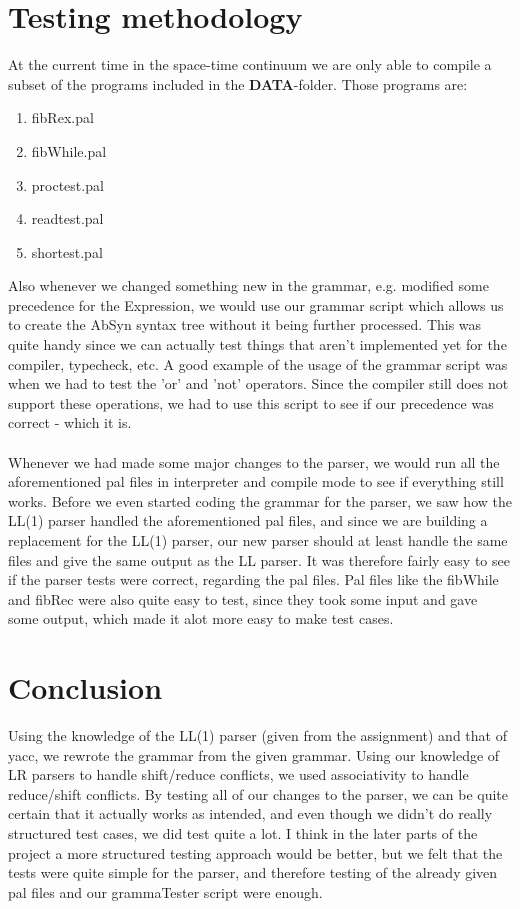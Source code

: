 \documentclass[12pt,a4paper]{article}
\begin{document}
\section{Testing methodology}
At the current time in the space-time continuum we are only able to compile a
subset of the programs included in the \textbf{DATA}-folder. Those programs
are:\\
\begin{enumerate}
  \item fibRex.pal
  \item fibWhile.pal
  \item proctest.pal
  \item readtest.pal
  \item shortest.pal
\end{enumerate}

Also whenever we changed something new in the grammar, e.g. modified some
precedence for the Expression, we would use our grammar script which allows us
to create the AbSyn syntax tree without it being further processed. This was
quite handy since we can actually test things that aren't implemented yet for
the compiler, typecheck, etc. A good example of the usage of the grammar script
was when we had to test the 'or' and 'not' operators. Since the compiler still
does not support these operations, we had to use this script to see if our
precedence was correct - which it is.
\\
\\
Whenever we had made some major changes to the parser, we would run all the
aforementioned pal files in interpreter and compile mode to see if everything
still works. Before we even started coding the grammar for the parser, we saw
how the LL(1) parser handled the aforementioned pal files, and since we are
building a replacement for the LL(1) parser, our new parser should at least
handle the same files and give the same output as the LL parser. It was
therefore fairly easy to see if the parser tests were correct, regarding the pal
files. Pal files like the fibWhile and fibRec were also quite easy to test,
since they took some input and gave some output, which made it alot more easy to
make test cases.


\section{Conclusion}
Using the knowledge of the LL(1) parser (given from the assignment) and that of
yacc, we rewrote the grammar from the given grammar. Using our knowledge of LR
parsers to handle shift/reduce conflicts, we used associativity to handle
reduce/shift conflicts. By testing all of our changes to the parser, we can be
quite certain that it actually works as intended, and even though we didn't do
really structured test cases, we did test quite a lot. I think in the later
parts of the project a more structured testing approach would be better, but we
felt that the tests were quite simple for the parser, and therefore testing of
the already given pal files and our grammaTester script were enough.

\newpage
\appendix

\end{document}
